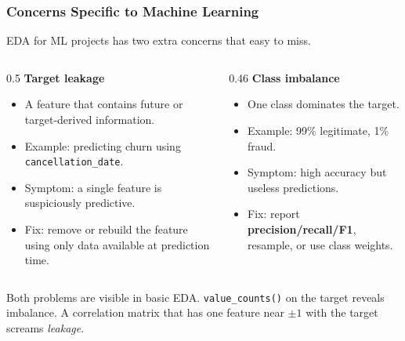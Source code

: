 \documentclass[aspectratio=169,10pt]{beamer}
\newcommand{\keyword}[1]{\textcolor{PrimaryBlue}{\textbf{#1}}}
\newcommand{\codeword}[1]{\texttt{#1}}
\newenvironment{bluebox}[1]{%
  \vspace{0.08cm}\begin{tcolorbox}[lecturebox,title={#1},fontupper=\small]%
}{\end{tcolorbox}\vspace{0.05cm}}
\begin{document}
\begin{frame}[fragile]
\frametitle{Concerns Specific to Machine Learning}
\small
EDA for ML projects has two extra concerns that easy to miss.

\vspace{0.18cm}
\begin{columns}[T,totalwidth=0.96\textwidth]
\begin{column}{0.5\textwidth}
\textbf{\keyword{Target leakage}}
\begin{itemize}\setlength\itemsep{0.04cm}
  \item A feature that contains future or target-derived information.
  \item Example: predicting churn using \texttt{cancellation\_date}.
  \item Symptom: a single feature is suspiciously predictive.
  \item Fix: remove or rebuild the feature using only data available at prediction time.
\end{itemize}
\end{column}
\begin{column}{0.46\textwidth}
\textbf{\keyword{Class imbalance}}
\begin{itemize}\setlength\itemsep{0.04cm}
  \item One class dominates the target.
  \item Example: 99\% legitimate, 1\% fraud.
  \item Symptom: high accuracy but useless predictions.
  \item Fix: report \keyword{precision/recall/F1}, resample, or use class weights.
\end{itemize}
\end{column}
\end{columns}

\vspace{0.15cm}
\begin{bluebox}{Catch these in EDA}
Both problems are visible in basic EDA. \codeword{value\_counts()} on the target reveals imbalance. A correlation matrix that has one feature near $\pm 1$ with the target screams \emph{leakage}.
\end{bluebox}
\end{frame}
\end{document}
